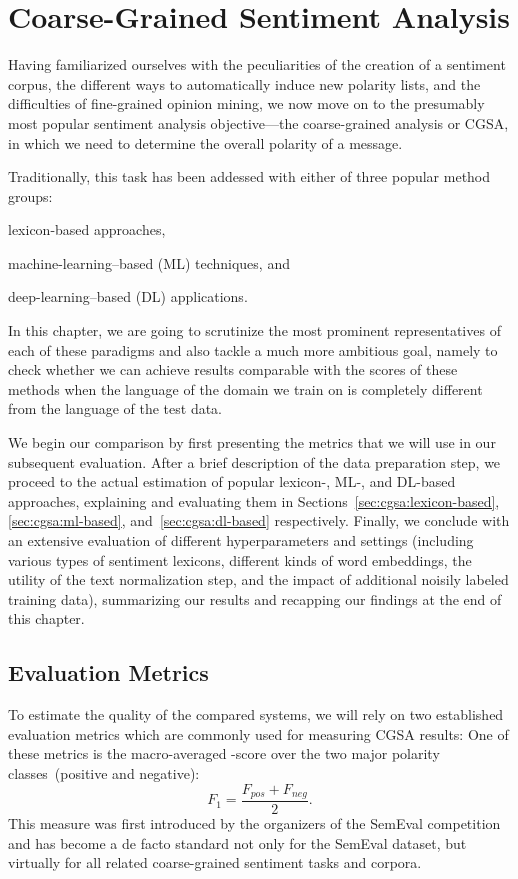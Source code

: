 \chapter{Coarse-Grained Sentiment Analysis}\label{sec:snt:cgsa}

Having familiarized ourselves with the peculiarities of the creation
of a sentiment corpus, the different ways to automatically induce new
polarity lists, and the difficulties of fine-grained opinion mining,
we now move on to the presumably most popular sentiment analysis
objective---the coarse-grained analysis or CGSA, in which we need to
determine the overall polarity of a message.

Traditionally, this task has been addessed with either of three
popular method groups:
\begin{inparaenum}[(i)]
  \item lexicon-based approaches,
  \item machine-learning--based (ML) techniques, and
  \item deep-learning--based (DL) applications.
\end{inparaenum}
In this chapter, we are going to scrutinize the most prominent
representatives of each of these paradigms and also tackle a much more
ambitious goal, namely to check whether we can achieve results
comparable with the scores of these methods when the language of the
domain we train on is completely different from the language of the
test data.

We begin our comparison by first presenting the metrics that we will
use in our subsequent evaluation.  After a brief description of the
data preparation step, we proceed to the actual estimation of popular
lexicon-, ML-, and DL-based approaches, explaining and evaluating them
in Sections~\ref{sec:cgsa:lexicon-based}, \ref{sec:cgsa:ml-based},
and~\ref{sec:cgsa:dl-based} respectively.  Finally, we conclude with
an extensive evaluation of different hyperparameters and settings
(including various types of sentiment lexicons, different kinds of
word embeddings, the utility of the text normalization step, and the
impact of additional noisily labeled training data), summarizing our
results and recapping our findings at the end of this chapter.

\section{Evaluation Metrics}\label{sec:cgsa:eval-metrics}

To estimate the quality of the compared systems, we will rely on two
established evaluation metrics which are commonly used for measuring
CGSA results: One of these metrics is the macro-averaged \F-score over
the two major polarity classes~(positive and negative): { \small%
  \begin{equation*}
    F_1 = \frac{F_{pos} + F_{neg}}{2}.
  \end{equation*}%
  \normalsize%
}%
This measure was first introduced by the organizers of the SemEval
competition~\cite{Nakov:13,Rosenthal:14,Rosenthal:15} and has become a
de facto standard not only for the SemEval dataset, but virtually for
all related coarse-grained sentiment tasks and corpora.

